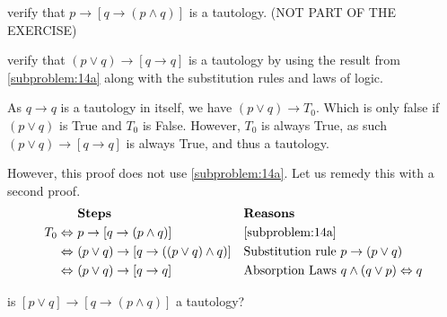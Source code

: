 \documentclass[a4paper, english, 12pt]{article} %
\begin{document}
\begin{subproblem}
  \label{subproblem:14a}
  verify that $p \to [q \to (p \wedge q)]$ is a tautology. (NOT PART OF THE EXERCISE)
\end{subproblem} 

\begin{subproblem}[2]
  verify that $(p \vee q) \to [q \to q]$ is a tautology by using the result from
  \cref{subproblem:14a} along with the substitution rules and laws of logic.
\end{subproblem}

\begin{answer}
 As $q \to q$ is a tautology in itself, we have $ (p \vee q) \to T_0$. Which is
 only false if $(p \vee q)$ is True and $T_0$ is False. However, $T_0$ is always
 True, as such $(p \vee q) \to [q \to q]$ is always True, and thus a tautology.

 However, this proof does not use \cref{subproblem:14a}. Let us remedy this with
 a second proof.
   \begin{align*}
      & \textbf{Steps} && \textbf{Reasons} \\
     T_0 \Leftrightarrow \ & p \to [q \to (p \wedge q)] 
     && \text{\Cref{subproblem:14a}}  \\
     \Leftrightarrow \ & (p \vee q) \to [q \to ((p \vee q) \wedge q)]
     && \text{Substitution rule $p \to (p \vee q)$} \\
     \Leftrightarrow \ & (p \vee q) \to [q \to q]
     && \text{Absorption Laws $q \wedge (q \vee p)\Leftrightarrow q$} \\
  \end{align*}

\end{answer}

\begin{subproblem}
  \label{subproblem:14c}
  is $[p \vee q] \to [q \to (p \wedge q)]$ a tautology?
\end{subproblem}
\end{document}
